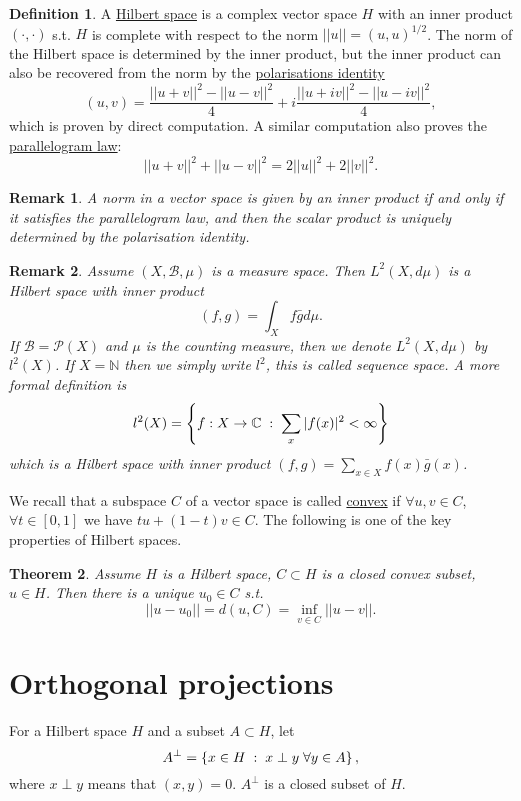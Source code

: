 \documentclass{article}
\newtheorem{theorem}{Theorem}[section]
\newtheorem*{remark}{Remark}
\theoremstyle{definition}
\newtheorem{definition}[theorem]{Definition}
\newcommand{\C}{\mathbb{C}}
\newcommand{\omm}{\hspace{1mm}}
\newcommand{\N}{\mathbb{N}}
\newcommand{\B}{\mathscr{B}}
\begin{document}
\begin{definition}
    A \underline{Hilbert space} is a complex vector space $H$ with an inner product $(\cdot,\cdot)$ s.t. $H$ is complete with respect to the norm $||u||=(u,u)^{1/2}$.
    The norm of the Hilbert space is determined by the inner product, but the inner product can also be recovered from the norm by the \underline{polarisations identity}
    $$(u,v) = \frac{||u+v||^2-||u-v||^2}{4}+i\frac{||u+iv||^2-||u-iv||^2}{4},$$
    which is proven by direct computation. A similar computation also proves the \underline{parallelogram law}:
    $$||u+v||^2 +||u-v||^2 = 2||u||^2 + 2||v||^2.$$

\end{definition}

\begin{remark}
    A norm in a vector space is given by an inner product if and only if it satisfies the parallelogram law, and then the scalar product is uniquely determined by the polarisation identity.
\end{remark}
\begin{remark}
    Assume $(X,\B,\mu)$ is a measure space. Then $L^2(X,d\mu)$ is a Hilbert space with inner product $$(f,g)=\int_X f\bar g d\mu.$$
    If $\B=\mathcal P(X)$ and $\mu$ is the counting measure, then we denote $L^2(X,d\mu)$ by $ l^2(X)$. If $X=\N$ then we simply write $l^2$, this is called sequence space. 
    A more formal definition is 
    $$l^2(X) = \left\{ f:X\rightarrow\C \omm :\omm \sum_{x}|f(x)|^2<\infty \right\}$$
    which is a Hilbert space with inner product $(f,g) = \sum_{x\in X}f(x)\bar g(x)$.
\end{remark}

We recall that a subspace $C$ of a vector space is called \underline{convex} if $\forall u,v\in C$, $\forall t\in[0,1]$ we have $tu+(1-t)v\in C$. 
The following is one of the key properties of Hilbert spaces. 
\begin{theorem}
    Assume $H$ is a Hilbert space, $C\subset H$ is a closed convex subset, $u\in H$. Then there is a unique $u_0\in C$ s.t. 
    $$||u-u_0|| = d(u,C) = \inf_{v\in C}||u-v||.$$ 
\end{theorem}

\section{Orthogonal projections}
For a Hilbert space $H$ and a subset $A\subset H$, let $$A^\perp = \left\{ x\in H\omm :\omm x\perp y\omm\forall y\in A\right\},$$
where $x\perp y$ means that $(x,y)=0$. $A^\perp$ is a closed subset of $H$.
\end{document}
